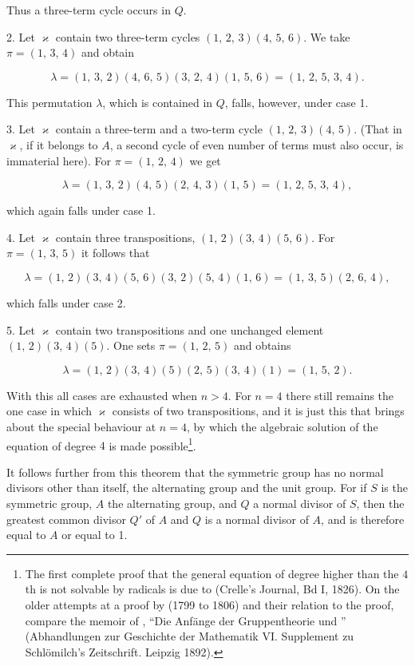 
Thus a three-term cycle occurs in $Q$.

2. Let $\varkappa$ contain two three-term cycles $(1,\,2,\,3)(4,\,5,\,6)$. We take $\pi = (1,\,3,\,4)$ and obtain

\[
\lambda = (1,\,3,\,2)(4,\,6,\,5)(3,\,2,\,4)(1,\,5,\,6) = (1,\,2,\,5,\,3,\,4).
\]

This permutation $\lambda$, which is contained in $Q$, falls, however, under case 1.

3. Let $\varkappa$ contain a three-term and a two-term cycle $(1,\,2,\,3)(4,\,5)$. (That in $\varkappa$, if it belongs to $A$, a second cycle of even number of terms must also occur, is immaterial here). For $\pi = (1,\,2,\,4)$ we get

\[
\lambda = (1,\,3,\,2)(4,\,5)(2,\,4,\,3)(1,\,5) = (1,\,2,\,5,\,3,\,4),
\]

which again falls under case 1.

4. Let $\varkappa$ contain three transpositions, $(1,\,2)(3,\,4)(5,\,6)$. For $\pi = (1,\,3,\,5)$ it follows that

\[
\lambda = (1,\,2)(3,\,4)(5,\,6)(3,\,2)(5,\,4)(1,\,6) = (1,\,3,\,5)(2,\,6,\,4),
\]

which falls under case 2.

5. Let $\varkappa$ contain two transpositions and one unchanged element $(1,\,2)(3,\,4)(5)$. One sets $\pi = (1,\,2,\,5)$ and obtains

\[
\lambda = (1,\,2)(3,\,4)(5)(2,\,5)(3,\,4)(1) = (1,\,5,\,2).
\]

With this all cases are exhausted when $n > 4$. For $n = 4$ there still remains the one case in which $\varkappa$ consists of two transpositions, and it is just this that brings about the special behaviour at $n = 4$, by which the algebraic solution of the equation of degree $4$ is made possible\footnote{The first complete proof that the general equation of degree higher than the $4$th is not solvable by radicals is due to  (Crelle's Journal, Bd I, 1826). On the older attempts at a proof by  (1799 to 1806) and their relation to the  proof, compare the memoir of , ``Die Anfänge der Gruppentheorie und '' (Abhandlungen zur Geschichte der Mathematik VI. Supplement zu Schlömilch's Zeitschrift. Leipzig 1892).}.

It follows further from this theorem that the symmetric group has no normal divisors other than itself, the alternating group and the unit group. For if $S$ is the symmetric group, $A$ the alternating group, and $Q$ a normal divisor of $S$, then the greatest common divisor $Q'$ of $A$ and $Q$ is a normal divisor of $A$, and is therefore equal to $A$ or equal to 1.
